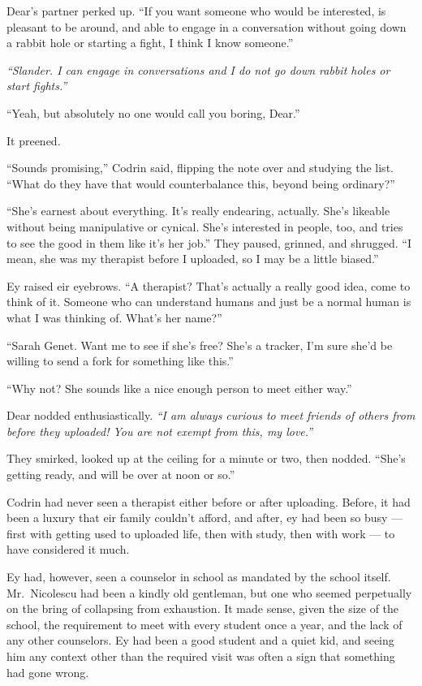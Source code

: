 Dear's partner perked up. ``If you want someone who would be interested, is pleasant to be around, and able to engage in a conversation without going down a rabbit hole or starting a fight, I think I know someone.''

\emph{``Slander. I can engage in conversations and I do not go down rabbit holes or start fights.''}

``Yeah, but absolutely no one would call you boring, Dear.''

It preened.

``Sounds promising,'' Codrin said, flipping the note over and studying the list. ``What do they have that would counterbalance this, beyond being ordinary?''

``She's earnest about everything. It's really endearing, actually. She's likeable without being manipulative or cynical. She's interested in people, too, and tries to see the good in them like it's her job.'' They paused, grinned, and shrugged. ``I mean, she was my therapist before I uploaded, so I may be a little biased.''

Ey raised eir eyebrows. ``A therapist? That's actually a really good idea, come to think of it. Someone who can understand humans and just be a normal human is what I was thinking of. What's her name?''

``Sarah Genet. Want me to see if she's free? She's a tracker, I'm sure she'd be willing to send a fork for something like this.''

``Why not? She sounds like a nice enough person to meet either way.''

Dear nodded enthusiastically. \emph{``I am always curious to meet friends of others from before they uploaded! You are not exempt from this, my love.''}

They smirked, looked up at the ceiling for a minute or two, then nodded. ``She's getting ready, and will be over at noon or so.''

Codrin had never seen a therapist either before or after uploading. Before, it had been a luxury that eir family couldn't afford, and after, ey had been so busy — first with getting used to uploaded life, then with study, then with work — to have considered it much.

Ey had, however, seen a counselor in school as mandated by the school itself. Mr.~Nicolescu had been a kindly old gentleman, but one who seemed perpetually on the bring of collapsing from exhaustion. It made sense, given the size of the school, the requirement to meet with every student once a year, and the lack of any other counselors. Ey had been a good student and a quiet kid, and seeing him any context other than the required visit was often a sign that something had gone wrong.


